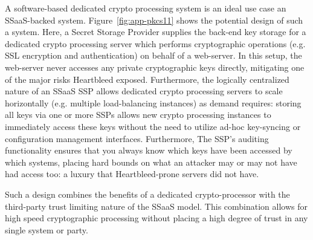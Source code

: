 A software-based dedicated crypto processing system is an ideal use
case an SSaaS-backed system. Figure~\ref{fig:app-pkcs11} shows the
potential design of such a system. Here, a Secret Storage Provider
supplies the back-end key storage for a dedicated crypto processing
server which performs cryptographic operations (e.g. SSL encryption
and authentication) on behalf of a web-server. In this setup, the
web-server never accesses any private cryptographic keys directly,
mitigating one of the major risks Heartbleed exposed. Furthermore, the
logically centralized nature of an SSaaS SSP allows dedicated crypto
processing servers to scale horizontally (e.g. multiple load-balancing
instances) as demand requires: storing all keys via one or more SSPs
allows new crypto processing instances to immediately access these
keys without the need to utilize ad-hoc key-syncing or configuration
management interfaces. Furthermore, The SSP's auditing functionality
ensures that you always know which keys have been accessed by which
systems, placing hard bounds on what an attacker may or may not have
had access too: a luxury that Heartbleed-prone servers did not have.

Such a design combines the benefits of a dedicated crypto-processor
with the third-party trust limiting nature of the SSaaS model. This
combination allows for high speed cryptographic processing without
placing a high degree of trust in any single system or party.

